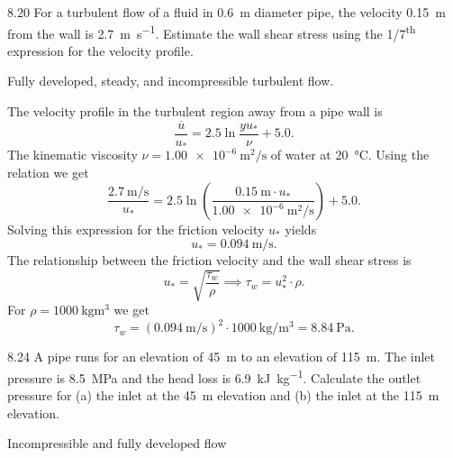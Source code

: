 
\begin{problem}{8.20}
  For a turbulent flow of a fluid in \qty{0,6}{\m} diameter pipe, the velocity \qty{0,15}{\m} from the wall is \qty{2,7}{\m\per\s}.
  Estimate the wall shear stress using the 1/7\textsuperscript{th} expression for the velocity profile.
\end{problem}

\begin{assumptions}
  \item Fully developed, steady, and incompressible turbulent flow.
\end{assumptions}

\begin{derivation}
  The velocity profile in the turbulent region away from a pipe wall is
  \[ 
  \frac{\overline{u}}{u_{*}} = \num{2,5}  \ln \frac{y u_{*}}{\nu} + \num{5,0}
  .\]
  The kinematic viscosity $\nu = \qty{1,00e-6}{\square\m\per\s} $ of water at \qty{20}{\celsius}.
  Using the relation we get
  \[ 
  \frac{\qty{2,7}{\m\per\s} }{u_{*}} = \num{2,5} \ln \left( \frac{\qty{0,15}{\m} \cdot u_{*}}{\qty{1,00e-6}{\square\m\per\s} } \right) + \num{5,0}
  .\]
  Solving this expression for the friction velocity $u_{*}$ yields
  \[ 
  u_{*} = \qty{0,094}{\m\per\s} 
  .\]
  The relationship between the friction velocity and the wall shear stress is
  \[ 
    u_{*} = \sqrt{\frac{\tau_w}{\rho}} \implies \tau_w = u_{*}^2 \cdot \rho
  .\]
  For $\rho = \qty{1000}{\kg\cubic\m}$ we get
  \[ 
  \tau_w = \left( \qty{0,094}{\m\per\s}  \right)^{2} \cdot \qty{1000}{\kg\per\cubic\m} = \qty{8,84}{\Pa}
  .\]
\end{derivation}



\begin{problem}{8.24}
  A pipe runs for an elevation of \qty{45}{\m} to an elevation of \qty{115}{\m}.
  The inlet pressure is \qty{8,5}{\MPa} and the head loss is \qty{6,9}{\kJ\per\kg}.
  Calculate the outlet pressure for (a) the inlet at the \qty{45}{\m} elevation and (b) the inlet at the \qty{115}{\m} elevation.
\end{problem}

\begin{assumptions}
  \item Incompressible and fully developed flow
\end{assumptions}

